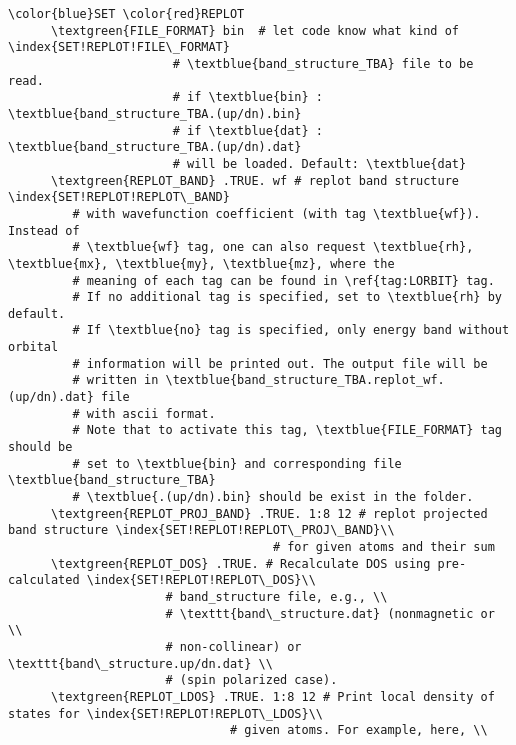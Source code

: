 \documentclass[a4paper,12pt]{scrartcl}
\newcommand{\textblue}[1]{\textcolor{blue!85!white}{\texttt{#1}}}
\newcommand{\textgreen}[1]{\textcolor{green!50!black}{\texttt{#1}}}
\begin{document}
\begin{description}
 \begin{Verbatim}[commandchars=\\\{\},gobble=4, frame=single, framesep=2mm, 
    label= DOS setup example,
    labelposition=bottomline]
    \color{blue}SET \color{red}REPLOT
      \textgreen{FILE_FORMAT} bin  # let code know what kind of \index{SET!REPLOT!FILE\_FORMAT}
                       # \textblue{band_structure_TBA} file to be read.
                       # if \textblue{bin} : \textblue{band_structure_TBA.(up/dn).bin}
                       # if \textblue{dat} : \textblue{band_structure_TBA.(up/dn).dat}
                       # will be loaded. Default: \textblue{dat}
      \textgreen{REPLOT_BAND} .TRUE. wf # replot band structure \index{SET!REPLOT!REPLOT\_BAND}
         # with wavefunction coefficient (with tag \textblue{wf}). Instead of 
         # \textblue{wf} tag, one can also request \textblue{rh}, \textblue{mx}, \textblue{my}, \textblue{mz}, where the 
         # meaning of each tag can be found in \ref{tag:LORBIT} tag.
         # If no additional tag is specified, set to \textblue{rh} by default.
         # If \textblue{no} tag is specified, only energy band without orbital 
         # information will be printed out. The output file will be
         # written in \textblue{band_structure_TBA.replot_wf.(up/dn).dat} file
         # with ascii format.
         # Note that to activate this tag, \textblue{FILE_FORMAT} tag should be 
         # set to \textblue{bin} and corresponding file \textblue{band_structure_TBA}
         # \textblue{.(up/dn).bin} should be exist in the folder.
      \textgreen{REPLOT_PROJ_BAND} .TRUE. 1:8 12 # replot projected band structure \index{SET!REPLOT!REPLOT\_PROJ\_BAND}\\
                                     # for given atoms and their sum
      \textgreen{REPLOT_DOS} .TRUE. # Recalculate DOS using pre-calculated \index{SET!REPLOT!REPLOT\_DOS}\\ 
                      # band_structure file, e.g., \\ 
                      # \texttt{band\_structure.dat} (nonmagnetic or \\
                      # non-collinear) or \texttt{band\_structure.up/dn.dat} \\
                      # (spin polarized case).
      \textgreen{REPLOT_LDOS} .TRUE. 1:8 12 # Print local density of states for \index{SET!REPLOT!REPLOT\_LDOS}\\
                               # given atoms. For example, here, \\

\end{Verbatim}
\end{description}
\end{document}
